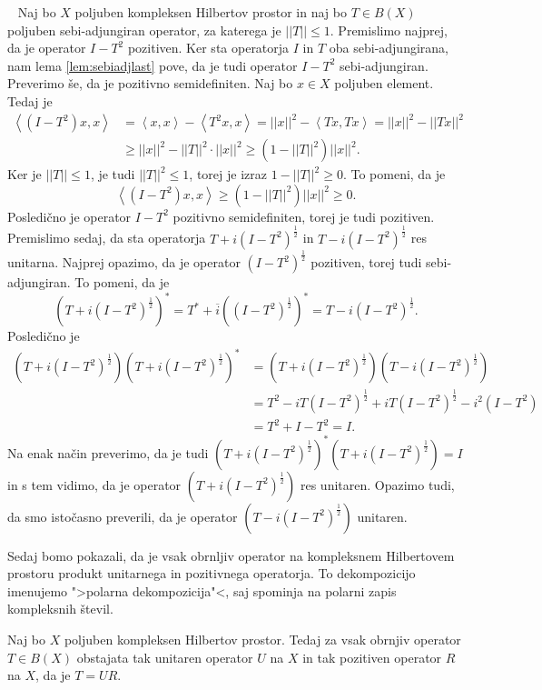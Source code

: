 \documentclass[12pt,a4paper,oneside,fleqn,openany]{book}
\newcommand{\eopf}{\raisebox{0.8ex}{\framebox{}}} %
\newenvironment{dokaz}%
{\noindent{\bf Dokaz.}\ }%
{\hfill\eopf\par\bigskip}%
\newcommand{\abs}[1]{\ensuremath{\lvert #1 \rvert}}
\newcommand{\norm}[1]{\abs{\abs{#1}}}
\newcommand{\Sp}[2]{\ensuremath{\left<#1, #2\right>}}
\begin{document}
\begin{dokaz}
	Naj bo $X$ poljuben kompleksen Hilbertov prostor in naj bo $T\in B(X)$ poljuben sebi-adjungiran operator, za katerega je $\norm{T}\leq 1$. Premislimo najprej, da je operator $I-T^2$ pozitiven. Ker sta operatorja $I$ in $T$ oba sebi-adjungirana, nam lema \ref{lem:sebiadjlast} pove, da je tudi operator $I-T^2$ sebi-adjungiran. Preverimo še, da je pozitivno semidefiniten. Naj bo $x\in X$ poljuben element. Tedaj je \begin{align*}
		\Sp{(I-T^2)x}{x} &= \Sp{x}{x} - \Sp{T^2x}{x} = \norm{x}^2 - \Sp{Tx}{Tx} = \norm{x}^2 - \norm{Tx}^2 \\ &\geq \norm{x}^2 - \norm{T}^2\cdot\norm{x}^2 \geq (1-\norm{T}^2)\norm{x}^2.
	\end{align*}
	Ker je $\norm{T}\leq 1$, je tudi $\norm{T}^2 \leq 1$, torej je izraz $1-\norm{T}^2\geq 0$. To pomeni, da je $$\Sp{(I-T^2)x}{x}\geq(1-\norm{T}^2)\norm{x}^2 \geq 0.$$ Posledično je operator $I-T^2$ pozitivno semidefiniten, torej je tudi pozitiven.
	Premislimo sedaj, da sta operatorja $T + i(I-T^2)^{\frac{1}{2}}$ in $T - i(I-T^2)^{\frac{1}{2}}$ res unitarna. Najprej opazimo, da je operator $(I-T^2)^{\frac{1}{2}}$ pozitiven, torej tudi sebi-adjungiran. To pomeni, da je $$(T + i(I-T^2)^{\frac{1}{2}})^*= T^* + \overline{i}((I-T^2)^{\frac{1}{2}})^* = T - i(I-T^2)^{\frac{1}{2}}.$$ Posledično je \begin{align*}
		(T + i(I-T^2)^{\frac{1}{2}})(T + i(I-T^2)^{\frac{1}{2}})^*&= (T + i(I-T^2)^{\frac{1}{2}})(T - i(I-T^2)^{\frac{1}{2}}) \\
		&=T^2 - iT(I-T^2)^{\frac{1}{2}} + iT(I-T^2)^{\frac{1}{2}} -i^2(I-T^2) \\
		&= T^2 + I - T^2 = I.
	\end{align*}
	Na enak način preverimo, da je tudi $(T + i(I-T^2)^{\frac{1}{2}})^*(T + i(I-T^2)^{\frac{1}{2}})=I$ in s tem vidimo, da je operator $(T + i(I-T^2)^{\frac{1}{2}})$ res unitaren. Opazimo tudi, da smo istočasno preverili, da je operator $(T - i(I-T^2)^{\frac{1}{2}})$ unitaren.
\end{dokaz}

Sedaj bomo pokazali, da je vsak obrnljiv operator na kompleksnem Hilbertovem prostoru produkt unitarnega in pozitivnega operatorja. To dekompozicijo imenujemo ">polarna dekompozicija"<, saj spominja na polarni zapis kompleksnih števil.

\begin{izrek}
	Naj bo $X$ poljuben kompleksen Hilbertov prostor. Tedaj za vsak obrnjiv operator $T\in B(X)$ obstajata tak unitaren operator $U$ na $X$ in tak pozitiven operator $R$ na $X$, da je $T = UR$.
\end{izrek}
\end{document}
